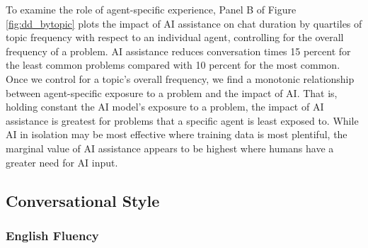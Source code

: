 \documentclass[11pt]{article}
\begin{document}
To examine the role of agent-specific experience, Panel B of Figure \ref{fig:dd_bytopic} plots the impact of AI assistance on chat duration by quartiles of topic frequency with respect to an individual agent, controlling for the overall frequency of a problem.  AI assistance reduces conversation times 15 percent for the least common problems compared with 10 percent for the most common.  Once we control for a topic's overall frequency, we find a monotonic relationship between agent-specific exposure to a problem and the impact of AI. That is, holding constant the AI model's exposure to a problem, the impact of AI assistance is greatest for problems that a specific agent is least exposed to.  While AI in isolation may be most effective where training data is most plentiful, the marginal value of AI assistance appears to be highest where humans have a greater need for AI input. 


\subsection{Conversational Style}



\subsubsection{English Fluency} \label{sec:englishproficiency}
\end{document}
